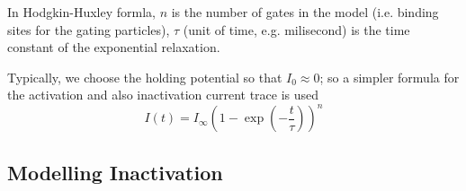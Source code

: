 In Hodgkin-Huxley formla, $n$ is the number of gates in the model (i.e. binding
sites for the gating particles), $\tau$ (unit of time, e.g. milisecond)
is the time constant of the exponential relaxation.

Typically, we choose the holding potential so that $I_0 \approx 0$; so a simpler
formula for the activation and also inactivation current trace is used
\begin{equation}
I(t) = I_\infty  \left( 1 - \exp(-\frac{t}{\tau}) \right)^n
\end{equation}

\subsection{Modelling Inactivation}
\label{sec:ball-and-chain-model-of-inactivation}


